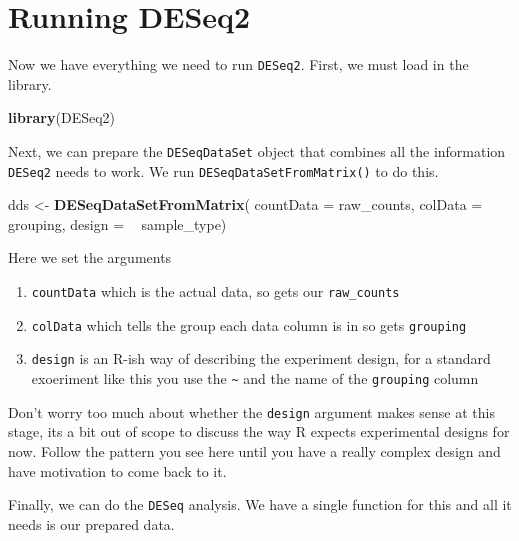 \documentclass[]{book}
\newenvironment{Shaded}{\begin{snugshade}}{\end{snugshade}}
\newcommand{\DataTypeTok}[1]{\textcolor[rgb]{0.13,0.29,0.53}{#1}}
\newcommand{\KeywordTok}[1]{\textcolor[rgb]{0.13,0.29,0.53}{\textbf{#1}}}
\newcommand{\NormalTok}[1]{#1}
\newcommand{\OperatorTok}[1]{\textcolor[rgb]{0.81,0.36,0.00}{\textbf{#1}}}
\newcommand{\StringTok}[1]{\textcolor[rgb]{0.31,0.60,0.02}{#1}}
\providecommand{\tightlist}{%
  \setlength{\itemsep}{0pt}\setlength{\parskip}{0pt}}
\begin{document}
\hypertarget{running-deseq2-1}{%
\section{Running DESeq2}\label{running-deseq2-1}}

Now we have everything we need to run \texttt{DESeq2}. First, we must load in the library.

\begin{Shaded}
\begin{Highlighting}[]
\KeywordTok{library}\NormalTok{(DESeq2)}
\end{Highlighting}
\end{Shaded}

Next, we can prepare the \texttt{DESeqDataSet} object that combines all the information \texttt{DESeq2} needs to work. We run \texttt{DESeqDataSetFromMatrix()} to do this.

\begin{Shaded}
\begin{Highlighting}[]
\NormalTok{dds <-}\StringTok{ }\KeywordTok{DESeqDataSetFromMatrix}\NormalTok{(}
  \DataTypeTok{countData =}\NormalTok{ raw_counts, }
  \DataTypeTok{colData =}\NormalTok{ grouping, }
  \DataTypeTok{design =} \OperatorTok{~}\StringTok{ }\NormalTok{sample_type)}
\end{Highlighting}
\end{Shaded}

Here we set the arguments

\begin{enumerate}
\def\labelenumi{\arabic{enumi}.}
\tightlist
\item
  \texttt{countData} which is the actual data, so gets our \texttt{raw\_counts}
\item
  \texttt{colData} which tells the group each data column is in so gets \texttt{grouping}
\item
  \texttt{design} is an R-ish way of describing the experiment design, for a standard exoeriment like this you use the \texttt{\textasciitilde{}} and the name of the \texttt{grouping} column
\end{enumerate}

Don't worry too much about whether the \texttt{design} argument makes sense at this stage, its a bit out of scope to discuss the way R expects experimental designs for now. Follow the pattern you see here until you have a really complex design and have motivation to come back to it.

Finally, we can do the \texttt{DESeq} analysis. We have a single function for this and all it needs is our prepared data.
\end{document}
